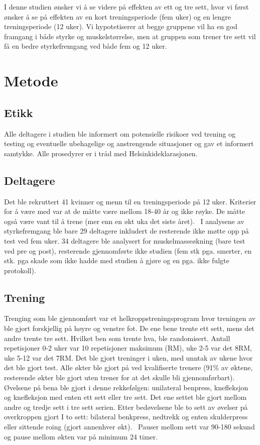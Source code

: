 \documentclass[
]{book}
\begin{document}
I denne studien ønsker vi å se videre på effekten av ett og tre sett, hvor vi først ønsker å se på effekten av en kort treningsperiode (fem uker) og en lengre treningsperiode (12 uker). Vi hypotetiserer at begge gruppene vil ha en god framgang i både styrke og muskelstørrelse, men at gruppen som trener tre sett vil få en bedre styrkefremgang ved både fem og 12 uker.

\hypertarget{metode-2}{%
\section{Metode}\label{metode-2}}

\hypertarget{etikk}{%
\subsection{Etikk}\label{etikk}}

Alle deltagere i studien ble informert om potensielle risikoer ved trening og testing og eventuelle ubehagelige og anstrengende situasjoner og gav et informert samtykke. Alle prosedyrer er i tråd med Helsinkideklarasjonen.

\hypertarget{deltagere}{%
\subsection{Deltagere}\label{deltagere}}

Det ble rekruttert 41 kvinner og menn til en treningsperiode på 12 uker. Kriterier for å være med var at de måtte være mellom 18-40 år og ikke røyke. De måtte også være vant til å trene (mer enn en økt uka det siste året). ~I analysene av styrkefremgang ble bare 29 deltagere inkludert de resterende ikke møtte opp på test ved fem uker. 34 deltagere ble analysert for muskelmasseøkning (bare test ved pre og post), resterende gjennomførte ikke studien (fem stk pga. smerter, en stk. pga skade som ikke hadde med studien å gjøre og en pga. ikke fulgte protokoll).

\hypertarget{trening}{%
\subsection{Trening}\label{trening}}

Trenging som ble gjennomført var et helkroppstreningsprogram hvor treningen av ble gjort forskjellig på høyre og venstre fot. De ene bene trente ett sett, mens det andre trente tre sett. Hvilket ben som trente hva, ble randomisert. Antall repetisjoner 0-2 uker var 10 repetisjoner maksimum (RM), uke 2-5 var det 8RM, uke 5-12 var det 7RM. Det ble gjort treninger i uken, med unntak av ukene hvor det ble gjort test. Alle økter ble gjort på ved kvalifiserte trenere (91\% av øktene, resterende økter ble gjort uten trener for at det skulle bli gjennomførbart). Øvelsene på bena ble gjort i denne rekkefølgen: unilateral benpress, knefleksjon og knefleksjon med enten ett sett eller tre sett. Det ene settet ble gjort mellom andre og tredje sett i tre sett serien. Etter bedøvelsene ble to sett av øvelser på overkroppen gjort I to sett: bilateral benkpress, nedtrekk og enten skulderpress eller sittende roing (gjort annenhver økt).~ Pauser mellom sett var 90-180 sekund og pause mellom økten var på minimum 24 timer.
\end{document}
